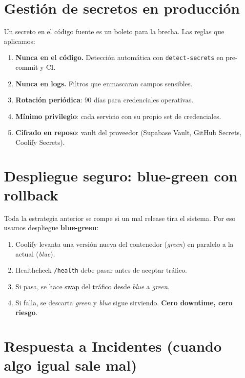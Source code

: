 \documentclass[12pt,a4paper,oneside]{article}
\begin{document}
\section{Gestión de secretos en producción}

Un secreto en el código fuente es un boleto para la brecha. Las reglas que aplicamos:

\begin{enumerate}[leftmargin=*]
  \item \textbf{Nunca en el código.} Detección automática con \texttt{detect-secrets} en pre-commit y CI.
  \item \textbf{Nunca en logs.} Filtros que enmascaran campos sensibles.
  \item \textbf{Rotación periódica}: 90 días para credenciales operativas.
  \item \textbf{Mínimo privilegio}: cada servicio con su propio set de credenciales.
  \item \textbf{Cifrado en reposo}: vault del proveedor (Supabase Vault, GitHub Secrets, Coolify Secrets).
\end{enumerate}

\section{Despliegue seguro: blue-green con rollback}

Toda la estrategia anterior se rompe si un mal release tira el sistema. Por eso usamos despliegue \textbf{blue-green}:

\begin{enumerate}[leftmargin=*]
  \item Coolify levanta una versión nueva del contenedor (\textit{green}) en paralelo a la actual (\textit{blue}).
  \item Healthcheck \texttt{/health} debe pasar antes de aceptar tráfico.
  \item Si pasa, se hace swap del tráfico desde \textit{blue} a \textit{green}.
  \item Si falla, se descarta \textit{green} y \textit{blue} sigue sirviendo. \textbf{Cero downtime, cero riesgo}.
\end{enumerate}

\section{Respuesta a Incidentes (cuando algo igual sale mal)}
\end{document}
